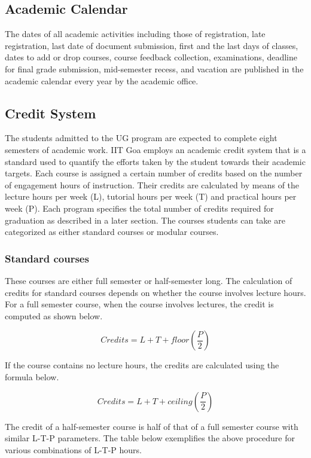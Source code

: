 \documentclass[a4paper, 12pt]{article}
\begin{document}
\subsection{Academic Calendar}

The dates of all academic activities including those of registration, late registration, last date of document submission, first and the last days of classes, dates to add or drop courses, course feedback collection, examinations, deadline for final grade submission, mid-semester recess, and vacation are published in the academic calendar every year by the academic office.

\subsection{Credit System}

The students admitted to the UG program are expected to complete eight semesters of academic work. IIT Goa employs an academic credit system that is a standard used to quantify the efforts taken by the student towards their academic targets. Each course is assigned a certain number of credits based on the number of engagement hours of instruction. Their credits are calculated by means of the lecture hours per week (L), tutorial hours per week (T) and practical hours per week (P). Each program specifies the total number of credits required for graduation as described in a later section. The courses students can take are categorized as either standard courses or modular courses.

\subsubsection{Standard courses}

These courses are either full semester or half-semester long. The calculation of credits for standard courses depends on whether the course involves lecture hours. For a full semester course, when the course involves lectures, the credit is computed as shown below.


	\[Credits=L+T+floor(\frac{P}{2})\]


If the course contains no lecture hours, the credits are calculated using the formula below.


	\[Credits=L+T+ceiling(\frac{P}{2})\]


The credit of a half-semester course is half of that of a full semester course with similar L-T-P parameters. The table below exemplifies the above procedure for various combinations of L-T-P hours.
\end{document}
